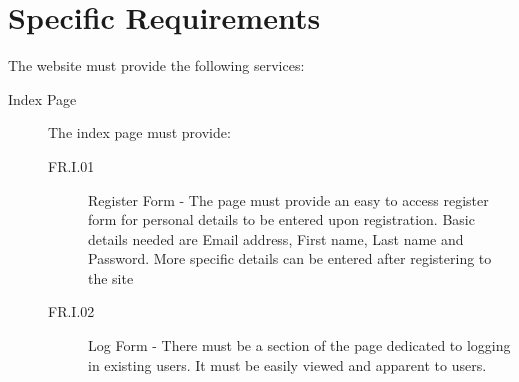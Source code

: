 \documentclass[11pt]{article}
\begin{document}
\section{Specific Requirements}
The website must provide the following services:
\begin{description}

\item[Index Page] The index page must provide:
\begin{description}
\item[FR.I.01] Register Form - The page must provide an easy to access register form for personal details to be entered upon registration. Basic details needed are Email address, First name, Last name and Password. More specific details can be entered after registering to the site
\item[FR.I.02] Log Form - There must be a section of the page dedicated to logging in existing users. It must be easily viewed and apparent to users.
\end{description}


\end{description}
\end{document}
